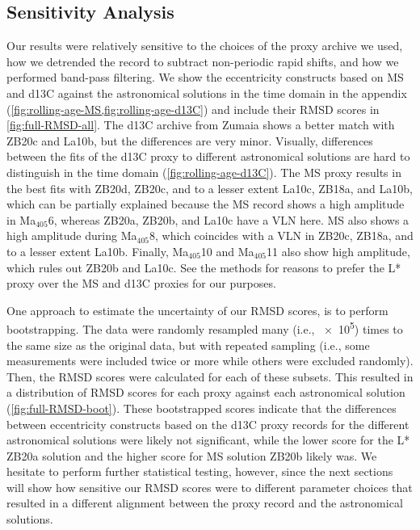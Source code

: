 \documentclass[draft]{agujournal2019}
\newcommand{\ma}[1]{Ma\(_{405}\)#1} %
\begin{document}
\subsection{Sensitivity Analysis}\label{sec:sensitivity}

Our results were relatively sensitive to the choices of the proxy archive we used, how we detrended the record to subtract non-periodic rapid shifts, and how we performed band-pass filtering.
We show the eccentricity constructs based on \gls{MS} and \gls{d13C} against the astronomical solutions in the time domain in the appendix (\cref{fig:rolling-age-MS,fig:rolling-age-d13C}) and include their \gls{RMSD} scores in \cref{fig:full-RMSD-all}.
The \gls{d13C} archive from Zumaia shows a better match with ZB20c and La10b, but the differences are very minor.
Visually, differences between the fits of the \gls{d13C} proxy to different astronomical solutions are hard to distinguish in the time domain (\cref{fig:rolling-age-d13C}).
The \gls{MS} proxy results in the best fits with ZB20d, ZB20c, and to a lesser extent La10c, ZB18a, and La10b, which can be partially explained because the \gls{MS} record shows a high amplitude in \ma{6}, whereas ZB20a, ZB20b, and La10c have a \gls{VLN} here.
\gls{MS} also shows a high amplitude during \ma{8}, which coincides with a \gls{VLN} in ZB20c, ZB18a, and to a lesser extent La10b.
Finally, \ma{10} and \ma{11} also show high amplitude, which rules out ZB20b and La10c.
See the methods for reasons to prefer the \gls{L*} proxy over the \gls{MS} and \gls{d13C} proxies for our purposes.

One approach to estimate the uncertainty of our \gls{RMSD} scores, is to perform bootstrapping.
The data were randomly resampled many (i.e., \num{e5}) times to the same size as the original data, but with repeated sampling (i.e., some measurements were included twice or more while others were excluded randomly).
Then, the \gls{RMSD} scores were calculated for each of these subsets.
This resulted in a distribution of \gls{RMSD} scores for each proxy against each astronomical solution (\cref{fig:full-RMSD-boot}).
These bootstrapped scores indicate that the differences between eccentricity constructs based on the \gls{d13C} proxy records for the different astronomical solutions were likely not significant,
while the lower score for the \gls{L*} ZB20a solution
and the higher score for \gls{MS} solution ZB20b
likely was.
We hesitate to perform further statistical testing, however, since the next sections will show how sensitive our \gls{RMSD} scores were to different parameter choices that resulted in a different alignment between the proxy record and the astronomical solutions.
\end{document}
